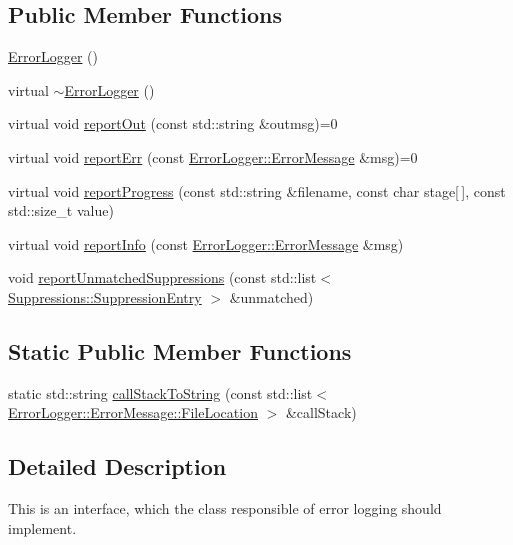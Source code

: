 \subsection*{Public Member Functions}
\begin{DoxyCompactItemize}
\item 
\hyperlink{class_error_logger_a08f4b631947bbaef31ece976bf5e28ae}{Error\-Logger} ()
\item 
virtual \hyperlink{class_error_logger_afb11bcbb1a52695e91f8d87653f18f02}{$\sim$\-Error\-Logger} ()
\item 
virtual void \hyperlink{class_error_logger_aeb9c56add35e46cd83e9b7e92e5e110c}{report\-Out} (const std\-::string \&outmsg)=0
\item 
virtual void \hyperlink{class_error_logger_aea56e01f24c0d8ecaa5498ae4eba1739}{report\-Err} (const \hyperlink{class_error_logger_1_1_error_message}{Error\-Logger\-::\-Error\-Message} \&msg)=0
\item 
virtual void \hyperlink{class_error_logger_ad8cb6cf6c75bc6c2cb850c37fa3609df}{report\-Progress} (const std\-::string \&filename, const char stage\mbox{[}$\,$\mbox{]}, const std\-::size\-\_\-t value)
\item 
virtual void \hyperlink{class_error_logger_ab192b3c92cc4e0b785b09c435d5762c4}{report\-Info} (const \hyperlink{class_error_logger_1_1_error_message}{Error\-Logger\-::\-Error\-Message} \&msg)
\item 
void \hyperlink{class_error_logger_a897a97284123c2501d719307aad5bccb}{report\-Unmatched\-Suppressions} (const std\-::list$<$ \hyperlink{struct_suppressions_1_1_suppression_entry}{Suppressions\-::\-Suppression\-Entry} $>$ \&unmatched)
\end{DoxyCompactItemize}
\subsection*{Static Public Member Functions}
\begin{DoxyCompactItemize}
\item 
static std\-::string \hyperlink{class_error_logger_ad88029b1e8954bf5907cd62fe422c57f}{call\-Stack\-To\-String} (const std\-::list$<$ \hyperlink{class_error_logger_1_1_error_message_1_1_file_location}{Error\-Logger\-::\-Error\-Message\-::\-File\-Location} $>$ \&call\-Stack)
\end{DoxyCompactItemize}


\subsection{Detailed Description}
This is an interface, which the class responsible of error logging should implement. 

